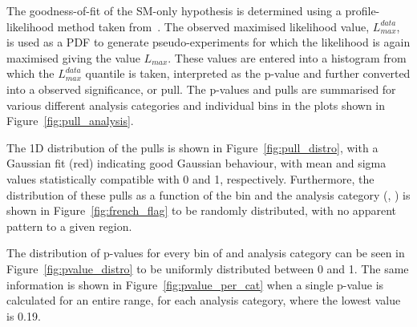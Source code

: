 
The goodness-of-fit of the SM-only hypothesis is determined using a profile-likelihood method
taken from~\cite{Cowan:358560}.
The observed maximised likelihood value, $L^{data}_{max}$, is used as a
PDF to generate
pseudo-experiments for which the likelihood is again maximised giving the 
value $L_{max}$. These
values are entered into a histogram from which the $L^{data}_{max}$ quantile is taken, 
interpreted as the p-value and further converted into a observed significance,
or pull.
The p-values and pulls are summarised for various different analysis categories and individual
\HT bins in the plots shown in Figure~\ref{fig:pull_analysis}.

The 1D distribution of the
pulls is shown in Figure~\ref{fig:pull_distro}, with a Gaussian fit (red)
indicating good Gaussian behaviour, with mean and sigma values statistically
compatible with 0 and 1, respectively. Furthermore, the distribution of
these pulls as a function of the \HT bin and
the analysis category (\nb, \nj) is shown in Figure~\ref{fig:french_flag} to be
randomly distributed, with no apparent pattern to a given region.

The distribution of p-values for every bin of \HT and analysis category can be
seen in Figure~\ref{fig:pvalue_distro} to be uniformly distributed between 0
and 1. The same information is shown in Figure~\ref{fig:pvalue_per_cat} when a
single p-value is calculated for an entire \HT range, for each analysis
category, where the lowest value is 0.19.





